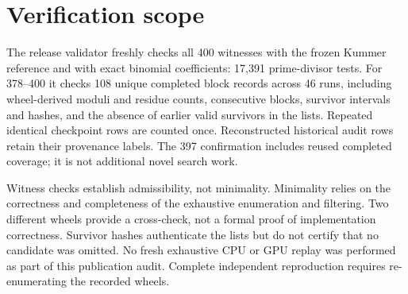 \documentclass[11pt]{amsart}
\begin{document}
\section{Verification scope}
The release validator freshly checks all 400 witnesses with the frozen Kummer
reference and with exact binomial coefficients: 17,391 prime-divisor tests.
For 378--400 it checks 108 unique completed block records across 46 runs,
including wheel-derived moduli and residue counts, consecutive blocks, survivor
intervals and hashes, and the absence of earlier valid survivors in the lists.
Repeated identical checkpoint rows are counted once. Reconstructed historical
audit rows retain their provenance labels. The 397 confirmation includes reused
completed coverage; it is not additional novel search work.

Witness checks establish admissibility, not minimality. Minimality relies on the
correctness and completeness of the exhaustive enumeration and filtering.
Two different wheels provide a cross-check, not a formal proof of implementation
correctness. Survivor hashes authenticate the lists but do not certify that no
candidate was omitted. No fresh exhaustive CPU or GPU replay was performed as
part of this publication audit. Complete independent reproduction requires
re-enumerating the recorded wheels.
\end{document}
